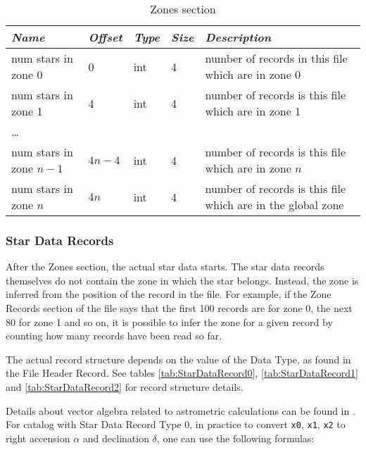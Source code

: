 \begin{table}[htbp]
\begin{tabularx}{\textwidth}{llllX}\toprule
\emph{Name} & \emph{Offset} & \emph{Type} & \emph{Size} &\emph{Description}\\\midrule
num stars in zone 0     & 0      & int & 4 &  number of records in this file which are in zone 0\\%
num stars in zone 1     & 4      & int & 4 &  number of records is this file which are in zone 1\\
\ldots                  &        &     &   &\\
num stars in zone $n-1$ & $4n-4$ & int & 4 &  number of records is this file which are in zone $n$\\\bottomrule
num stars in zone $n$   & $4n$   & int & 4 &  number of records is this file which are in the global zone\\\bottomrule
\end{tabularx}
\caption{Zones section}
\label{tab:Catalogues:stars:record:zones}
\end{table}

\subsubsection{Star Data Records}%
\label{sec:Catalogues:stars:record:data}

After the Zones section, the actual star data starts. The star data
records themselves do not contain the zone in which the star belongs.
Instead, the zone is inferred from the position of the record in the
file. For example, if the Zone Records section of the file says that the
first 100 records are for zone 0, the next 80 for zone 1 and so on, it
is possible to infer the zone for a given record by counting how many
records have been read so far.

The actual record structure depends on the value of the Data Type, as
found in the File Header Record.
See tables 
\ref{tab:StarDataRecord0}, \ref{tab:StarDataRecord1} and \ref{tab:StarDataRecord2}
for record structure details.

Details about vector algebra related to astrometric calculations can be 
found in \citep{2012asas.book.....V}. For catalog with Star Data Record 
Type 0, in practice to convert \texttt{x0}, \texttt{x1}, \texttt{x2} to 
right accension $\alpha$ and declination $\delta$, one can use the following 
formulas:

